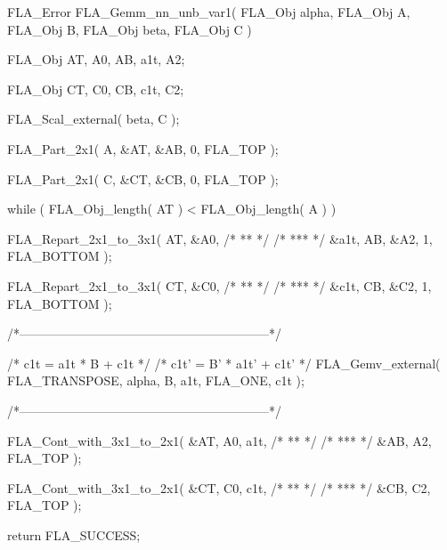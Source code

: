 {\scriptsize
\begin{listing}{37}
FLA_Error FLA_Gemm_nn_unb_var1( FLA_Obj alpha, FLA_Obj A, FLA_Obj B, FLA_Obj beta, FLA_Obj C )
{
  FLA_Obj AT,              A0,
          AB,              a1t,
                           A2;

  FLA_Obj CT,              C0,
          CB,              c1t,
                           C2;

  FLA_Scal_external( beta, C );

  FLA_Part_2x1( A,    &AT, 
                      &AB,            0, FLA_TOP );

  FLA_Part_2x1( C,    &CT, 
                      &CB,            0, FLA_TOP );

  while ( FLA_Obj_length( AT ) < FLA_Obj_length( A ) ){

    FLA_Repart_2x1_to_3x1( AT,                &A0, 
                        /* ** */            /* *** */
                                              &a1t, 
                           AB,                &A2,        1, FLA_BOTTOM );

    FLA_Repart_2x1_to_3x1( CT,                &C0, 
                        /* ** */            /* *** */
                                              &c1t, 
                           CB,                &C2,        1, FLA_BOTTOM );

    /*------------------------------------------------------------*/

    /* c1t  = a1t * B + c1t    */
    /* c1t' = B' * a1t' + c1t' */
    FLA_Gemv_external( FLA_TRANSPOSE, alpha, B, a1t, FLA_ONE, c1t );

    /*------------------------------------------------------------*/

    FLA_Cont_with_3x1_to_2x1( &AT,                A0, 
                                                  a1t, 
                            /* ** */           /* *** */
                              &AB,                A2,     FLA_TOP );

    FLA_Cont_with_3x1_to_2x1( &CT,                C0, 
                                                  c1t, 
                            /* ** */           /* *** */
                              &CB,                C2,     FLA_TOP );

  }

  return FLA_SUCCESS;
}
\end{listing}
}